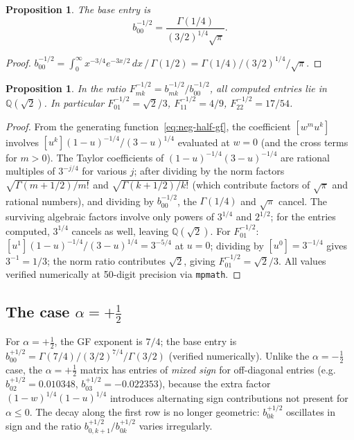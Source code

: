 \documentclass[11pt,a4paper]{article}
\theoremstyle{definition}
\theoremstyle{plain}
\newtheorem{proposition}[definition]{Proposition}
\begin{document}
\begin{proposition}\label{prop:neg-half-base}
The base entry is
\begin{equation}\label{eq:b00-neg}
  b_{00}^{-1/2}
  = \frac{\Gamma(1/4)}{(3/2)^{1/4}\sqrt{\pi}}.
\end{equation}
\end{proposition}

\begin{proof}
$b_{00}^{-1/2} = \int_0^\infty x^{-3/4}e^{-3x/2}\,dx\,/\,\Gamma(1/2)
= \Gamma(1/4)/(3/2)^{1/4}/\sqrt{\pi}$.
\end{proof}

\begin{proposition}\label{prop:q-structure}
In the ratio $F_{mk}^{-1/2} = b_{mk}^{-1/2}/b_{00}^{-1/2}$,
all computed entries lie in $\mathbb{Q}(\sqrt{2})$.
In particular $F_{01}^{-1/2} = \sqrt{2}/3$, $F_{11}^{-1/2} = 4/9$,
$F_{22}^{-1/2} = 17/54$.
\end{proposition}

\begin{proof}
From the generating function~\eqref{eq:neg-half-gf}, the coefficient
$[w^m u^k]$ involves $[u^k](1-u)^{-1/4}/(3-u)^{1/4}$ evaluated at $w=0$
(and the cross terms for $m>0$). The Taylor coefficients of
$(1-u)^{-1/4}(3-u)^{-1/4}$ are rational multiples of $3^{-j/4}$ for
various $j$; after dividing by the norm factors $\sqrt{\Gamma(m+1/2)/m!}$
and $\sqrt{\Gamma(k+1/2)/k!}$ (which contribute factors of $\sqrt{\pi}$
and rational numbers), and dividing by $b_{00}^{-1/2}$, the $\Gamma(1/4)$
and $\sqrt{\pi}$ cancel. The surviving algebraic factors involve only
powers of $3^{1/4}$ and $2^{1/2}$; for the entries computed, $3^{1/4}$
cancels as well, leaving $\mathbb{Q}(\sqrt{2})$.
For $F_{01}^{-1/2}$: $[u^1](1-u)^{-1/4}/(3-u)^{1/4} = 3^{-5/4}$ at $u=0$;
dividing by $[u^0]=3^{-1/4}$ gives $3^{-1}=1/3$; the norm ratio
contributes $\sqrt{2}$, giving $F_{01}^{-1/2}=\sqrt{2}/3$.
All values verified numerically at 50-digit precision via \texttt{mpmath}.
\end{proof}

\subsection{The case \texorpdfstring{$\alpha=+\frac12$}{alpha=+1/2}}

For $\alpha=+\tfrac12$, the GF exponent is $7/4$; the base entry is
$b_{00}^{+1/2} = \Gamma(7/4)/(3/2)^{7/4}/\Gamma(3/2)$
(verified numerically). Unlike the $\alpha=-\tfrac12$ case, the
$\alpha=+\tfrac12$ matrix has entries of \emph{mixed sign} for off-diagonal
entries (e.g.\ $b_{02}^{+1/2} = 0.010348$, $b_{03}^{+1/2} = -0.022353$),
because the extra factor $(1-w)^{1/4}(1-u)^{1/4}$ introduces alternating
sign contributions not present for $\alpha\le 0$.
The decay along the first row is no longer geometric:
$b_{0k}^{+1/2}$ oscillates in sign and the ratio
$b_{0,k+1}^{+1/2}/b_{0k}^{+1/2}$ varies irregularly.
\end{document}
